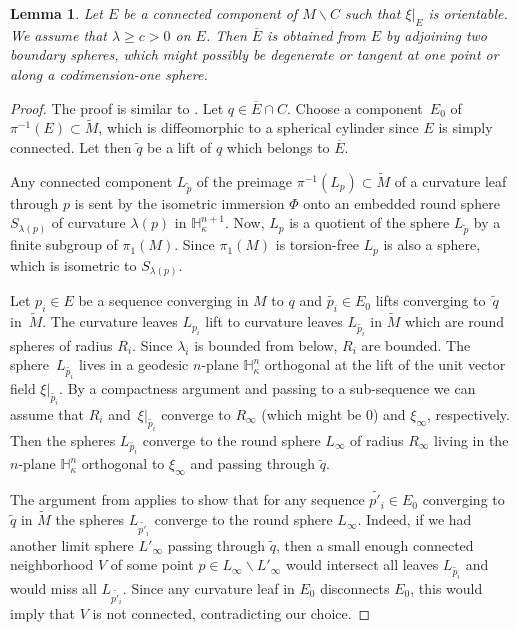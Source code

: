 \documentclass[JEP,XML,SOM,Unicode]{cedram}
\let\moins\smallsetminus
\newtheorem{lemma}[theorem]{Lemma}
\theoremstyle{definition}
\theoremstyle{remark}
\numberwithin{equation}{section}
\begin{document}
\begin{lemma}\label{compactification}
Let $E$ be a connected component of $M\moins C$ such that $\xi|_E$ is orientable. We assume that
$\lambda \geq c >0$ on $E$.
Then $\overline{E}$ is obtained from $E$ by adjoining
two boundary spheres, which might possibly be degenerate or tangent at one point or along a codimension-one sphere.
\end{lemma}
\begin{proof}
The proof is similar to \cite[Lem.\,2.7]{DDM}.
Let $q\in \overline{E}\cap C$.
Choose a component~$E_0$ of $\pi^{-1}(E)\subset \widetilde{M}$, which is diffeomorphic to a spherical cylinder
since $E$ is simply connected.
Let then $\widetilde{q}$ be a lift of $q$ which belongs to $\overline{E}$.

Any connected component $L_{\widetilde{p}}$ of the preimage $\pi^{-1}(L_{p})\subset \widetilde{M}$
of a curvature leaf through $p$
is sent by the isometric immersion $\Phi$ onto an embedded round sphere $S_{\lambda(p)}$ of curvature $\lambda(p)$
in $\mathbb H_{\kappa}^{n+1}$. Now, $L_{p}$ is a quotient of the sphere $L_{\widetilde{p}}$ by a finite subgroup of $\pi_1(M)$. Since $\pi_1(M)$ is torsion-free $L_{p}$ is also a sphere, which is isometric to $S_{\lambda(p)}$.

Let $p_i\in E$ be a sequence converging in $M$ to $q$ and $\widetilde{p_i}\in E_0$ lifts converging to~$\widetilde{q}$
in~$\widetilde{M}$.
The curvature leaves $L_{p_i}$ lift to curvature leaves $L_{\widetilde{p_i}}$ in $\widetilde{M}$
which are round spheres of radius $R_i$. Since $\lambda_i$ is bounded from below,
$R_i$ are bounded. The sphere~$L_{\widetilde{p_i}}$ lives in a geodesic
$n$-plane $\mathbb H_{\kappa}^n$ orthogonal at the lift of the unit vector field $\xi|_{\widetilde{p_i}}$.
By a compactness argument and passing to a sub-sequence we can assume that $R_i$ and~$\xi|_{\widetilde{p_i}}$
converge to $R_{\infty}$ (which might be $0$) and $\xi_{\infty}$, respectively. Then the spheres $L_{\widetilde{p_i}}$ converge to the
round sphere $L_{\infty}$ of radius $R_{\infty}$ living in the $n$-plane $\mathbb H_{\kappa}^n$ orthogonal
to $\xi_{\infty}$ and passing through $\widetilde{q}$.

The argument from \cite[Lem.\,2.7]{DDM} applies to show that
for any sequence $\widetilde{p'_i}\in E_0$ converging to $\widetilde{q}$
in $\widetilde{M}$ the spheres $L_{\widetilde{p'_i}}$ converge to the
round sphere $L_{\infty}$. Indeed, if we had another limit sphere $L'_{\infty}$ passing through $\widetilde{q}$, then a
small enough connected neighborhood $V$ of some point $p\in L_{\infty}\moins L'_{\infty}$ would intersect
all leaves $L_{\widetilde{p_i}}$ and would miss all $L_{\widetilde{p'_i}}$. Since any curvature leaf in
$E_0$ disconnects $E_0$, this would imply that $V$ is not connected, contradicting our choice.


\end{proof}
\end{document}
